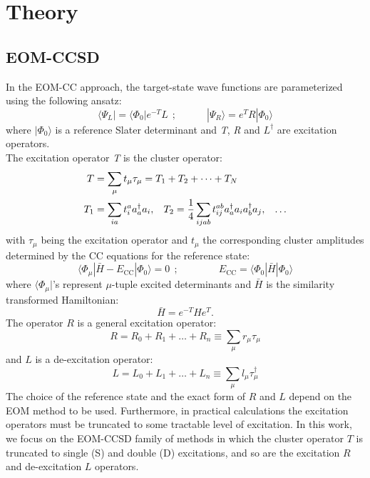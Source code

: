 \documentclass[journal=jctcce,manuscript=article]{achemso}
\begin{document}
\section{Theory}

\subsection{EOM-CCSD}
In the EOM-CC approach, the target-state wave functions are parameterized using the
following ansatz:~\cite{sekino1984linear,Stanton:93:EOMCC,CC_EOMCC_Bartlett,krylov_eom_2008}
\begin{equation}
\langle \Psi_L | = \langle \Phi_0 | e^{-T} {L}~~;
\quad \quad \quad | \Psi_R \rangle =  e^{T} {R}| \Phi_0 \rangle 
\end{equation}
where $| \Phi_0 \rangle $ is a reference Slater determinant and \textit{T}, \textit{R} and $L^\dagger$ are excitation operators.\\
The excitation operator \textit{T} is the cluster operator:\cite{Note-1}
\begin{equation}
\begin{aligned}
T &= \sum_{\mu} t_{\mu} \tau_{\mu} = T_1 + T_2 + \dots + T_N \\
T_1 &= \sum_{ia} t_i^a a_a^{\dagger}a_i ,\hspace{0.3cm}  T_2 = \frac{1}{4}\sum_{ijab} t_{ij}^{ab} a_a^{\dagger}a_i a_b^{\dagger}a_j ,\hspace{0.3cm}\dots 
\end{aligned}
\end{equation}
with $\tau_{\mu}$ being the excitation operator and $t_{\mu}$ the corresponding cluster amplitudes determined by the CC equations for the reference state:
\begin{equation}
\langle \Phi_\mu | \bar{H} - E_\text{CC} | \Phi_0 \rangle = 0~~; 
\qquad\qquad E_\text{CC} = \langle \Phi_0| \bar{H} | \Phi_0 \rangle
\end{equation}
where $\langle \Phi_\mu |$'s represent $\mu$-tuple excited determinants and $\bar{H}$ is the similarity transformed Hamiltonian:
\begin{equation}
\bar{H} = e^{-T} H e^{T}.
\end{equation}
The operator $R$ is a general excitation operator:
  \begin{equation}
   R = R_0 + R_1 + \dots + R_n \equiv \sum_\mu r_\mu \tau_\mu
   \end{equation}
and $L$ is a de-excitation operator:
  \begin{equation}
   L = L_0 + L_1 + \dots + L_n \equiv \sum_\mu l_\mu \tau^\dagger_\mu
   \end{equation}
  The choice of the reference state and the exact form of $R$ and $L$ depend on the EOM method to be used\cite{krylov_eom_2008,CC_EOMCC_Bartlett}.
  Furthermore, in practical calculations the excitation operators must be truncated to some tractable level of excitation. 
In this work, we focus on the EOM-CCSD family of methods in which
the cluster operator $T$ is truncated to single (S) and double (D) excitations, and so are the excitation $R$ and de-excitation $L$ operators.
\end{document}
